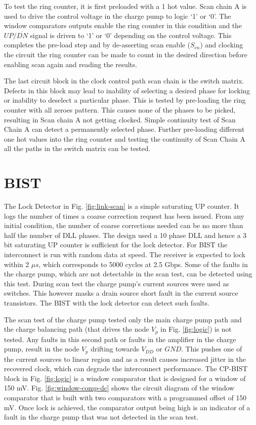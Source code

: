 \documentclass[conference]{IEEEtran}
\begin{document}
To test the ring counter, it is first preloaded with a 1 hot value. 
Scan chain A is used to drive the
control voltage in the charge pump to logic `1' or `0'. The 
window comparators outputs enable the ring counter in this
condition and the $UP/\overline{DN}$ signal is driven to `1' 
or `0' depending on the control voltage. This completes the pre-load
step and by de-asserting scan enable ($S_{en}$) and clocking
the circuit the ring counter can be made to count in the desired 
direction before enabling scan again and reading the results.

The last circuit block in the clock control path scan chain is the
switch matrix. Defects in this block may lead to inability of selecting
a desired phase for locking or inability to deselect a particular phase.
This is tested by pre-loading the ring counter with all zeroes pattern. This
causes none of the phases to be picked, resulting in Scan chain A not getting
clocked.
Simple continuity test of Scan Chain A can detect a permanently selected phase.
Further pre-loading different one hot values into the ring counter and testing 
the continuity of
Scan Chain A all the paths in the switch matrix can be tested.


\section{BIST}
The Lock Detector in Fig. \ref{fig:link-scan} is a simple saturating UP counter. 
It logs the number of times a coarse correction request has been issued. 
From any initial 
condition, the number of coarse corrections needed can be no more than half 
the number of DLL phases. The design used a 10 phase DLL and hence a 3 
bit saturating UP counter is sufficient for the lock detector.
For BIST the interconnect is
run with random data at speed. The receiver 
is expected to lock within 2 $\mu s$, which corresponds to 5000 cycles at
2.5 Gbps. Some of the faults in the charge pump, which are not detectable
in the scan test, can be detected using this test. During scan
test the charge pump's current sources were used as switches. This
however masks a drain source short fault in the current source transistors.
The BIST with the lock detector can detect such faults.

The scan test of the charge pump tested only the main charge
pump path and the charge balancing path (that drives the node $V_p$ in 
Fig. \ref{fig:logic}) is not tested. Any faults in this second
path or faults in the amplifier in the charge pump, result in the node $V_p$ 
drifting towards $V_{DD}$ or $GND$. 
This pushes one of the current sources to linear
region and as a result causes increased jitter in the recovered clock,
which can degrade the interconnect performance.
The CP-BIST block in Fig. \ref{fig:logic} is a window comparator 
that is designed for a window of 150 mV. Fig. \ref{fig:window-comp-dc} shows the
circuit diagram of the window comparator that is built with two 
comparators with a programmed offset of 150 mV. Once lock is achieved, the 
comparator output being high is an indicator of a fault in the charge pump that
was not detected in the scan test.
\end{document}
